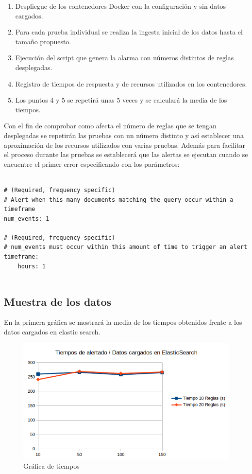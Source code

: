 \begin{enumerate}
	\item Despliegue de los contenedores Docker con la configuración y sin datos cargados.
	\item Para cada prueba individual se realiza la ingesta inicial de los datos   hasta el tamaño propuesto.
	\item Ejecución del script que genera la alarma con números distintos de reglas desplegadas.
	\item Registro de tiempos de respuesta y de recursos utilizados en los contenedores.
	\item Los puntos 4 y 5 se repetirá unas 5 veces y se calculará la media de los tiempos.
\end{enumerate}


Con el fin de comprobar como afecta el número de reglas que se tengan desplegadas se repetirán las pruebas con un número distinto y así establecer una aproximación de los recursos utilizados con varias pruebas. Además para facilitar el proceso durante las pruebas se establecerá que las alertas se ejecutan cuando se encuentre el primer error especificando con los parámetros:

\begin{verbatim}

# (Required, frequency specific)
# Alert when this many documents matching the query occur within a timeframe
num_events: 1

# (Required, frequency specific)
# num_events must occur within this amount of time to trigger an alert
timeframe:
    hours: 1
    
\end{verbatim}


\subsection{Muestra de los datos}

En la primera gráfica se mostrará la media de los tiempos obtenidos frente a los datos cargados en elastic search.

\begin{figure}[H]
\centerline{\includegraphics[width=15cm]{figuras/GraficaTiempos.png}}
\caption{Gráfica de tiempos}
\label{enlace1}
\end{figure}

